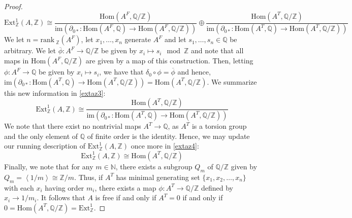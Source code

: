 \documentclass[english]{article}
\newcommand{\NN}{\mathbb{N}}
\newcommand{\ZZ}{\mathbb{Z}}
\newcommand{\QQ}{\mathbb{Q}}
\theoremstyle{remark}
\theoremstyle{definition}
\newcommand{\acl}{\overline}
\renewcommand{\hom}{\mathrm{Hom}}
\newcommand{\im}{\mathrm{im}}
\newcommand{\ext}{\mathrm{Ext}}
\newcommand{\rank}{\mathrm{rank}~}
\newcommand{\del}{\partial}
\newcommand{\idl}[1]{\left\langle{#1}\right\rangle }
\begin{document}
\begin{proof}
\begin{equation}
	\ext_\ZZ^1(A,\ZZ)\cong \frac{\hom(A^F,\QQ/\ZZ)}{\im\left(\del_{0*}:\hom(A^F,\QQ)\to\hom(A^F,\QQ/\ZZ)\right)}\oplus\frac{\hom(A^T,\QQ/\ZZ)}{\im\left(\del_{0*}:\hom(A^T,\QQ)\to\hom(A^T,\QQ/\ZZ)\right)}\label{extaz2}
\end{equation}
We let $n=\rank_\ZZ(A^F)$, let $x_1,\hdots, x_n$ generate $A^F$ and let $s_1,\hdots,s_n\in \QQ$ be arbitrary. We let $\acl{\phi}:A^F\to \QQ/\ZZ$ be given by $x_i\mapsto s_i\mod \ZZ$ and note that all maps in $\hom(A^F,\QQ/\ZZ)$ are given by a map of this construction. Then, letting $\phi:A^F\to \QQ$ be given by $x_i\mapsto s_i$, we have that $\delta_0\circ \phi=\acl\phi$ and hence, $\im\left(\del_{0*}:\hom(A^T,\QQ)\to\hom(A^T,\QQ/\ZZ)\right)=\hom(A^T,\QQ/\ZZ)$. We summarize this new information in \ref{extaz3}:
\begin{equation}
\ext_\ZZ^1(A,\ZZ)\cong \frac{\hom(A^T,\QQ/\ZZ)}{\im\left(\del_{0*}:\hom(A^T,\QQ)\to\hom(A^T,\QQ/\ZZ)\right)}\label{extaz3}
\end{equation}
We note that there exist no nontrivial maps $A^T\to \QQ$, as $A^T$ is a torsion group and the only element of $\QQ$ of finite order is the identity. Hence, we may update our running description of $\ext_\ZZ^1(A,\ZZ)$ once more in \ref{extaz4}:
\begin{equation}
\ext_\ZZ^1(A,\ZZ)\cong {\hom(A^T,\QQ/\ZZ)}\label{extaz4}
\end{equation}
Finally, we note that for any $m\in \NN$, there exists a subgroup $Q_m$ of $\QQ/\ZZ$ given by $Q_m=\idl{1/m}\cong \ZZ/m$. Thus, if $A^T$ has minimal generating set $\{x_1,x_2,\hdots, x_n\}$ with each $x_i$ having order $m_i$, there exists a map $\phi:A^T\to \QQ/\ZZ$ defined by $x_i\to 1/m_i$. It follows that $A$ is free if and only if $A^T=0$ if and only if $0=\hom(A^T,\QQ/\ZZ)=\ext_\ZZ^1$. 
\end{proof}

\printbibliography
\end{document}
